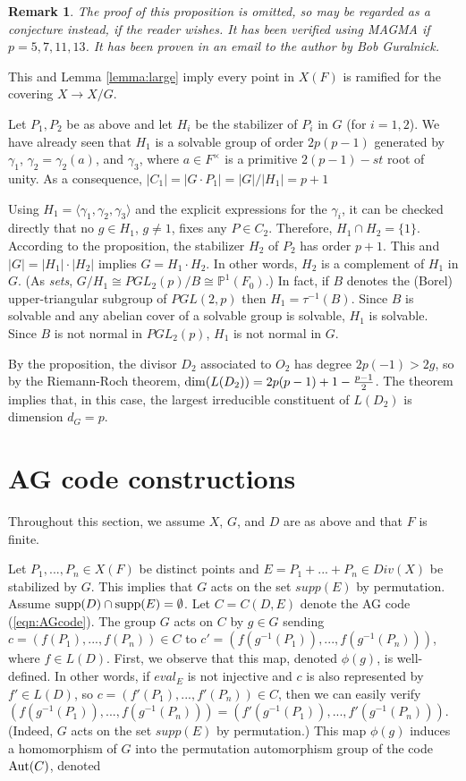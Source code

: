 \documentclass[12pt]{article}
\newtheorem{remark}{Remark}
\numberwithin{equation}{section}
\def\ppp{{\mathbb{P}}}
\begin{document}
\begin{remark}
The proof of this proposition
is omitted, so may be regarded as a conjecture
instead, if the reader wishes.
It has been verified using MAGMA if $p=5, 7,11, 13$. 
It has been proven in an
email to the author by Bob Guralnick.
\end{remark}


This and Lemma \ref{lemma:large} imply 
every point in $X(F)$ is ramified for the covering
$X\rightarrow X/G$.

Let $P_1,P_2$ be as above and 
let $H_i$ be the stabilizer of $P_i$ in $G$ (for $i=1,2$).
We have already seen that $H_1$ is a solvable group of order 
$2p(p-1)$ generated by 
$\gamma_1$, $\gamma_2=\gamma_2(a)$, and $\gamma_3$, where 
$a\in F^\times$ is a primitive $2(p-1)-st$ root
of unity. As a consequence,
$|C_1|=|G\cdot P_1|=|G|/|H_1|=p+1$ 

Using $H_1=\langle \gamma_1,\gamma_2,\gamma_3\rangle $ and the 
explicit expressions for the $\gamma_i$, it can be checked
directly that no $g\in H_1$, $g\not= 1$, fixes any
$P\in C_2$. Therefore, $H_1\cap H_2=\{1\}$.
According to the proposition, 
the stabilizer $H_2$ of $P_2$ has order $p+1$.
This and $|G|=|H_1|\cdot |H_2|$ implies $G=H_1\cdot H_2$.
In other words, $H_2$ is a complement of $H_1$ in $G$.
(As {\it sets}, $G/H_1\cong PGL_2(p)/B\cong \ppp^1(F_0)$.)
In fact,
if $B$ denotes the (Borel) upper-triangular subgroup
of $PGL(2,p)$ then $H_1=\tau^{-1}(B)$.
Since $B$ is solvable and any abelian cover of a solvable group is
solvable, $H_1$ is solvable.
Since $B$ is not normal in $PGL_2(p)$, $H_1$ is not normal in $G$.

By the proposition, the divisor $D_2$ associated to $O_2$ 
has degree $2p(-1)>2g$, so by the Riemann-Roch theorem, 
${\rm dim}(L(D_2))=2p(p-1)+1-\frac{p-1}{2}$. 
The theorem implies that, in this case, the largest 
irreducible constituent of $L(D_2)$ is dimension
$d_G=p$.

\section{AG code constructions}


Throughout this section, we assume $X$, $G$, and $D$ are
as above and that $F$ is finite.

Let $P_1,...,P_n\in X(F)$ be distinct points
and $E=P_1+...+P_n\in Div(X)$ be stabilized by $G$. 
This implies that $G$ acts on the set
$supp(E)$ by permutation.
Assume ${\rm supp}(D)\cap {\rm supp}(E)=\emptyset$.
Let $C=C(D,E)$ denote the AG code
(\ref{eqn:AGcode}).
The group $G$ acts on $C$ by $g\in G$ sending
$c=(f(P_1),...,f(P_n))\in C$ to $c'=(f(g^{-1}(P_1)),...,f(g^{-1}(P_n)))$,
where $f\in L(D)$.
First, we observe that this map, denoted $\phi(g)$, is well-defined.
In other words, if $eval_E$ is not injective and
$c$ is also represented by $f'\in L(D)$, so
$c=(f'(P_1),...,f'(P_n))\in C$, then we can easily verify
$(f(g^{-1}(P_1)),...,f(g^{-1}(P_n)))=
(f'(g^{-1}(P_1)),...,f'(g^{-1}(P_n)))$.
(Indeed, $G$ acts on the set
$supp(E)$ by permutation.)
This map $\phi(g)$ induces a homomorphism of $G$ into the permutation
automorphism group of the code ${\rm Aut}(C)$, denoted 
\end{document}
